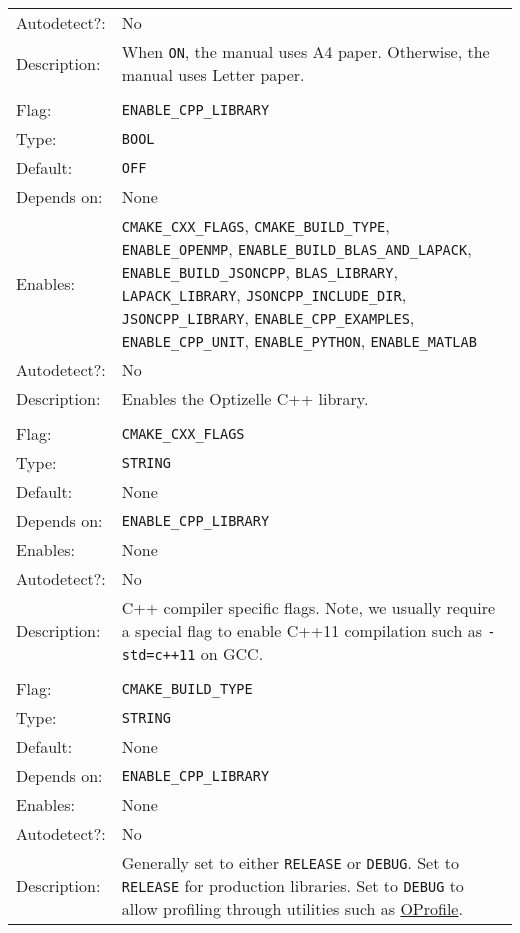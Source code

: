 \documentclass{report}
\begin{document}
\begin{center}
\begin{longtable}{p{}p{}}
Autodetect?:  &No\\
Description:  &When \texttt{ON}, the manual uses A4 paper.  Otherwise, the manual uses Letter paper.\\
\\
Flag:         &\texttt{ENABLE\_CPP\_LIBRARY}\\
Type:         &\texttt{BOOL}\\
Default:      &\texttt{OFF}\\
Depends on:   &None\\
Enables:      & \texttt{CMAKE\_CXX\_FLAGS}, 
                \texttt{CMAKE\_BUILD\_TYPE},
                \texttt{ENABLE\_OPENMP}, 
                \texttt{ENABLE\_BUILD\_BLAS\_AND\_LAPACK},
                \texttt{ENABLE\_BUILD\_JSONCPP},
                \texttt{BLAS\_LIBRARY},
                \texttt{LAPACK\_LIBRARY},
                \texttt{JSONCPP\_INCLUDE\_DIR},
                \texttt{JSONCPP\_LIBRARY},
                \texttt{ENABLE\_CPP\_EXAMPLES},
                \texttt{ENABLE\_CPP\_UNIT},
                \texttt{ENABLE\_PYTHON},
                \texttt{ENABLE\_MATLAB}\\
Autodetect?:  &No\\
Description:  &Enables the Optizelle C++ library.\\
\\
Flag:         &\texttt{CMAKE\_CXX\_FLAGS}\\
Type:         &\texttt{STRING}\\
Default:      &None\\
Depends on:   &\texttt{ENABLE\_CPP\_LIBRARY}\\
Enables:      &None\\
Autodetect?:  &No\\
Description:  &C++ compiler specific flags.  Note, we usually require a special flag to enable C++11 compilation such as \texttt{-std=c++11} on GCC.\\
\\
Flag:         &\texttt{CMAKE\_BUILD\_TYPE}\\
Type:         &\texttt{STRING}\\
Default:      &None\\
Depends on:   &\texttt{ENABLE\_CPP\_LIBRARY}\\
Enables:      &None\\
Autodetect?:  &No\\
Description:  &Generally set to either \texttt{RELEASE} or \texttt{DEBUG}.  Set to \texttt{RELEASE} for production libraries.  Set to \texttt{DEBUG} to allow profiling through utilities such as \href{http://oprofile.sourceforge.net}{OProfile}.\\

\end{longtable}
\end{center}
\end{document}

